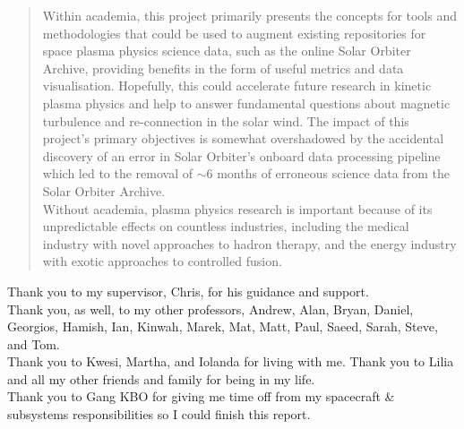 \begin{impactstatement}

\begin{quote}

Within academia, this project primarily presents the concepts for tools and methodologies that could be used to augment existing repositories for space plasma physics science data, such as the online Solar Orbiter Archive, providing benefits in the form of useful metrics and data visualisation. Hopefully, this could accelerate future research in kinetic plasma physics and help to answer fundamental questions about magnetic turbulence and re-connection in the solar wind. The impact of this project's primary objectives is somewhat overshadowed by the accidental discovery of an error in Solar Orbiter's onboard data processing pipeline which led to the removal of \(\sim6\) months of erroneous science data from the Solar Orbiter Archive.
\\

Without academia, plasma physics research is important because of its unpredictable effects on countless industries, including the medical industry with novel approaches to hadron therapy, and the energy industry with exotic approaches to controlled fusion.

\end{quote}
\end{impactstatement}

\begin{acknowledgements}
Thank you to my supervisor, Chris, for his guidance and support. 
\\

Thank you, as well, to my other professors, Andrew, Alan, Bryan, Daniel, Georgios, Hamish, Ian, Kinwah, Marek, Mat, Matt, Paul, Saeed, Sarah, Steve, and Tom. 
\\

Thank you to Kwesi, Martha, and Iolanda for living with me. Thank you to Lilia and all my other friends and family for being in my life.
\\

Thank you to Gang KBO for giving me time off from my spacecraft \& subsystems responsibilities so I could finish this report.
\end{acknowledgements}

\setcounter{tocdepth}{2} 

\tableofcontents
\listoffigures
\listoftables

